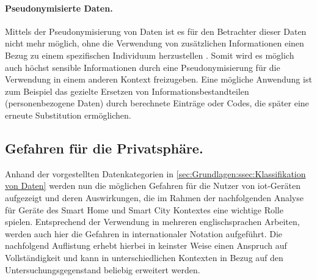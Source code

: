 
\paragraph{Pseudonymisierte Daten.}
\label{sec:Grundlagen:para:Pseudonymisierte Daten}
Mittels der Pseudonymisierung von Daten ist es für den Betrachter dieser Daten nicht mehr möglich, ohne die Verwendung von zusätzlichen Informationen einen Bezug zu einem spezifischen Individuum herzustellen \cite{DSGVOArt4}. 
Somit wird es möglich auch höchst sensible Informationen durch eine Pseudonymisierung für die Verwendung in einem anderen Kontext freizugeben. Eine mögliche Anwendung ist zum Beispiel das gezielte Ersetzen von Informationsbestandteilen (personenbezogene Daten) durch berechnete Einträge oder Codes, die später eine erneute Substitution ermöglichen.

\subsection{Gefahren für die Privatsphäre.}
\label{sec:Grundlagen:ssec:Gefahren für die Privatsphäre}

Anhand der vorgestellten Datenkategorien in \ref{sec:Grundlagen:ssec:Klassifikation von Daten} werden nun die möglichen Gefahren für die Nutzer von \ac{iot}-Geräten aufgezeigt und deren Auswirkungen, die im Rahmen der nachfolgenden Analyse für Geräte des Smart Home und Smart City Kontextes eine wichtige Rolle spielen. Entsprechend der Verwendung in mehreren englischsprachen Arbeiten, werden auch hier die Gefahren in internationaler Notation aufgeführt. 
Die nachfolgend Auflistung erhebt hierbei in keinster Weise einen Anspruch auf Vollständigkeit und kann in unterschiedlichen Kontexten in Bezug auf den Untersuchungsgegenstand beliebig erweitert werden.


